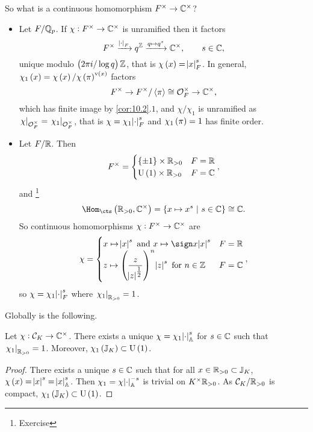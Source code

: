 So what is a continuous homomorphism $ F^\times \to \mathbb{C}^\times $?
\begin{itemize}
\item Let $ F / \mathbb{Q}_p $. If $ \chi : F^\times \to \mathbb{C}^\times $ is unramified then it factors
$$ F^\times \xrightarrow{\abs{\cdot}_F} q^{\mathbb{Z}} \xrightarrow{q \mapsto q^s} \mathbb{C}^\times, \qquad s \in \mathbb{C}, $$
unique modulo $ \br{2\pi i / \log q}\ZZ $, that is $ \chi\br{x} = \abs{x}_F^s $. In general, $ \chi_1\br{x} = \chi\br{x} / \chi\br{\pi}^{\v\br{x}} $ factors
$$ F^\times \to F^\times / \left\langle \pi \right\rangle \cong \mathcal{O}_F^\times \to \mathbb{C}^\times, $$
which has finite image by \ref{cor:10.2}.$ 1 $, and $ \chi / \chi_1 $ is unramified as $ \left. \chi \right|_{\mathcal{O}_F^\times} = \left. \chi_1 \right|_{\mathcal{O}_F^\times} $, that is $ \chi = \chi_1\abs{\cdot}_F^s $ and $ \chi_1\br{\pi} = 1 $ has finite order.
\item Let $ F / \mathbb{R} $. Then
$$ F^\times =
\begin{cases}
\cbr{\pm 1} \times \RR_{> 0} & F = \RR \\
\U\br{1} \times \RR_{> 0} & F = \CC
\end{cases},
$$
and \footnote{Exercise}
$$ \Hom_{\cts}\br{\RR_{> 0}, \CC^\times} = \cbr{x \mapsto x^s \st s \in \CC} \cong \CC. $$
So continuous homomorphisms $ \chi : F^\times \to \mathbb{C}^\times $ are
$$ \chi =
\begin{cases}
x \mapsto \abs{x}^s \ \text{and} \ x \mapsto \sign x\abs{x}^s & F = \RR \\
z \mapsto \br{\dfrac{z}{\abs{z}^{\tfrac{1}{2}}}}^n\abs{z}^s \ \text{for} \ n \in \ZZ & F = \CC
\end{cases},
$$
so $ \chi = \chi_1\abs{\cdot}_F^s $ where $ \left. \chi_1 \right|_{\mathbb{R}_{> 0}} = 1 $.
\end{itemize}
Globally is the following.

\begin{proposition}
Let $ \chi : \mathcal{C}_K \to \mathbb{C}^\times $. There exists a unique $ \chi = \chi_1\abs{\cdot}_{\mathbb{A}}^s $ for $ s \in \mathbb{C} $ such that $ \left. \chi_1 \right|_{\mathbb{R}_{> 0}} = 1 $. Moreover, $ \chi_1\br{\JJ_K} \subset \U\br{1} $.
\end{proposition}

\begin{proof}
There exists a unique $ s \in \mathbb{C} $ such that for all $ x \in \mathbb{R}_{> 0} \subset \mathbb{J}_K $, $ \chi\br{x} = \abs{x}^s = \abs{x}_\AA^s $. Then $ \chi_1 = \chi\abs{\cdot}_{\mathbb{A}}^{-s} $ is trivial on $ K^\times\mathbb{R}_{> 0} $. As $ \mathcal{C}_K / \mathbb{R}_{> 0} $ is compact, $ \chi_1\br{\JJ_K} \subset \U\br{1} $.
\end{proof}

